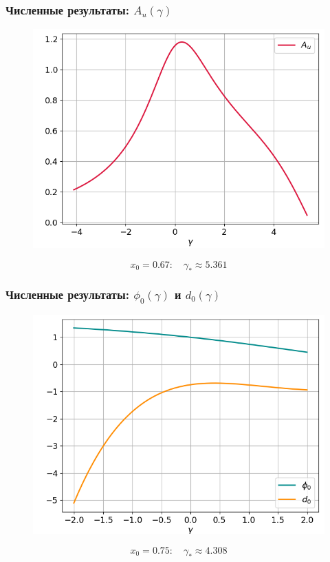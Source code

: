 \documentclass[fullscreen=true, unicode, bookmarks=false]{beamer}
\begin{document}
\begin{frame}
\frametitle{ Численные результаты: $ A_u(\gamma) $ }

\begin{figure} 
\includegraphics[scale=0.55]{divergent_amplitude_23.png}  
\end{figure}

$$ x_0 = 0.67: \quad \gamma_* \approx 5.361 $$

\end{frame}

\begin{frame}
\frametitle{ Численные результаты: $ \phi_0(\gamma) $ и $ d_0(\gamma) $ }

\begin{figure} 
\includegraphics[scale=0.55]{divergent_phi0d0_34.png}  
\end{figure}

$$ x_0 = 0.75: \quad \gamma_* \approx 4.308 $$

\end{frame}
\end{document}
